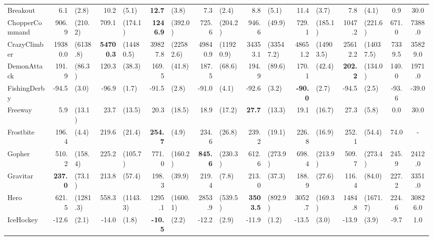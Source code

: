 \begin{landscape}
\begin{changemargin}{0cm}{0cm}
\begin{center}
\begin{table}[!htbp]
\begin{tabular}{l|rl|rl|rl|rl|rl|rl|rl|c|c}
Breakout       &      6.1 &     (2.8) &     10.2 &      (5.1) &\textbf{     12.7 }&      (3.8) &      7.3 &      (2.4) &      8.8 &      (5.1) &     11.4 &      (3.7) &      7.8 &      (4.1) &      0.9 &     30.0 \\
ChopperCommand &    906.9 &   (210.2) &    709.1 &    (174.1) &\textbf{   1246.9 }&    (392.0) &    725.6 &    (204.2) &    946.6 &     (49.9) &    729.1 &    (185.1) &   1047.2 &    (221.6) &    671.0 &   7388.0 \\
CrazyClimber   &  19380.0 &  (6138.8) &\textbf{  54700.3 }&  (14480.5) &  39827.8 &  (22582.6) &  49840.9 &  (11920.9) &  34353.1 &  (33547.2) &  48651.2 &  (14903.5) &  25612.2 &  (14037.5) &   7339.5 &  35829.0 \\
DemonAttack    &    191.9 &    (86.3) &    120.3 &     (38.3) &    169.5 &     (41.8) &    187.5 &     (68.6) &    194.9 &     (89.6) &    170.1 &     (42.4) &\textbf{    202.2 }&    (134.0) &    140.0 &   1971.0 \\
FishingDerby   &    -94.5 &     (3.0) &    -96.9 &      (1.7) &    -91.5 &      (2.8) &    -91.0 &      (4.1) &    -92.6 &      (3.2) &\textbf{    -90.0 }&      (2.7) &    -94.5 &      (2.5) &    -93.6 &    -39.0 \\
Freeway        &      5.9 &    (13.1) &     23.7 &     (13.5) &     20.3 &     (18.5) &     18.9 &     (17.2) &\textbf{     27.7 }&     (13.3) &     19.1 &     (16.7) &     27.3 &      (5.8) &      0.0 &     30.0 \\
Frostbite      &    196.4 &     (4.4) &    219.6 &     (21.4) &\textbf{    254.7 }&      (4.9) &    234.6 &     (26.8) &    239.2 &     (19.1) &    226.8 &     (16.9) &    252.1 &     (54.4) &     74.0 &      - \\
Gopher         &    510.2 &   (158.4) &    225.2 &    (105.7) &    771.0 &    (160.2) &\textbf{    845.6 }&    (230.3) &    612.6 &    (273.9) &    698.4 &    (213.9) &    509.7 &    (273.4) &    245.9 &   2412.0 \\
Gravitar       &\textbf{    237.0 }&    (73.1) &    213.8 &     (57.4) &    198.3 &     (39.9) &    219.4 &      (7.8) &    213.0 &     (37.3) &    188.9 &     (27.6) &    116.4 &     (84.0) &    227.2 &   3351.0 \\
Hero           &    621.5 &  (1281.3) &    558.3 &   (1143.3) &   1295.1 &   (1600.1) &   2853.9 &    (539.5) &\textbf{   3503.5 }&    (892.9) &   3052.7 &    (169.3) &   1484.8 &   (1671.7) &    224.6 &  30826.0 \\
IceHockey      &    -12.6 &     (2.1) &    -14.0 &      (1.8) &\textbf{    -10.5 }&      (2.2) &    -12.2 &      (2.9) &    -11.9 &      (1.2) &    -13.5 &      (3.0) &    -13.9 &      (3.9) &     -9.7 &      1.0 \\

\end{tabular}
\end{table}
\end{center}
\end{changemargin}
\end{landscape}
